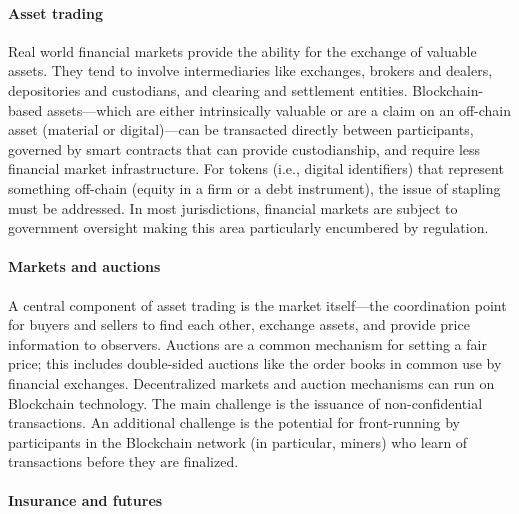 \paragraph{Asset trading}

Real world financial markets provide the ability for the exchange of valuable assets. 
They tend to involve intermediaries like exchanges, brokers and dealers, depositories and custodians, and clearing and settlement entities. 
Blockchain-based assets---which are either intrinsically valuable or are a claim on an off-chain asset (material or digital)---can be transacted directly between participants, governed by smart contracts that can provide custodianship, and require less financial market infrastructure.
For tokens (i.e., digital identifiers) that represent something off-chain (\ie equity in a firm or a debt instrument), the issue of stapling must be addressed.
In most jurisdictions, financial markets are subject to government oversight making this area particularly encumbered by regulation.

\paragraph{Markets and auctions}

A central component of asset trading is the market itself---the coordination point for buyers and sellers to find each other, exchange assets, and provide price information to observers.
Auctions are a common mechanism for setting a fair price; this includes double-sided auctions like the order books in common use by financial exchanges. 
Decentralized markets and auction mechanisms can run on Blockchain technology.
The main challenge is the issuance of non-confidential transactions. 
An additional challenge is the potential for front-running by participants in the Blockchain network (in particular, miners) who learn of transactions before they are finalized. 

\paragraph{Insurance and futures}

